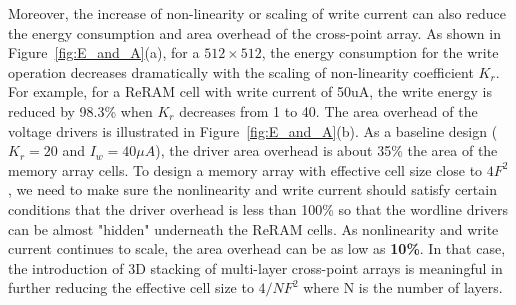 Moreover, the increase of non-linearity or scaling of write current can
also reduce the energy consumption and area overhead of the cross-point
array. As shown in Figure~\ref{fig:E_and_A}(a), for a $512 \times 512$,
the energy consumption for the write operation decreases dramatically with
the scaling of non-linearity coefficient $K_r$. For example, for a ReRAM
cell with write current of 50uA, the write energy is reduced by 98.3\%
when $K_r$ decreases from 1 to 40. The area overhead of the voltage
drivers is illustrated in Figure~\ref{fig:E_and_A}(b). As a baseline
design ($K_r=20$ and $I_w=40\mu A$), the driver area overhead is about
35\% the area of the memory array cells. To design a memory array with
effective cell size close to $4F^2$, we need to make sure the nonlinearity
and write current should satisfy certain conditions that the driver
overhead is less than 100\% so that the wordline drivers can be almost
"hidden" underneath the ReRAM cells. As nonlinearity and write current
continues to scale, the area overhead can be as low as \textbf{10\%}. In
that case, the introduction of 3D stacking of multi-layer cross-point
arrays is meaningful in further reducing the effective cell size to $4/N
F^2$ where N is the number of layers.



